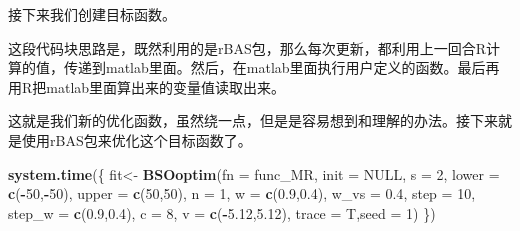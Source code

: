 \documentclass[]{ctexbook}
\newenvironment{Shaded}{\begin{snugshade}}{\end{snugshade}}
\newcommand{\KeywordTok}[1]{\textcolor[rgb]{0.13,0.29,0.53}{\textbf{#1}}}
\newcommand{\DataTypeTok}[1]{\textcolor[rgb]{0.13,0.29,0.53}{#1}}
\newcommand{\DecValTok}[1]{\textcolor[rgb]{0.00,0.00,0.81}{#1}}
\newcommand{\FloatTok}[1]{\textcolor[rgb]{0.00,0.00,0.81}{#1}}
\newcommand{\StringTok}[1]{\textcolor[rgb]{0.31,0.60,0.02}{#1}}
\newcommand{\CommentTok}[1]{\textcolor[rgb]{0.56,0.35,0.01}{\textit{#1}}}
\newcommand{\OtherTok}[1]{\textcolor[rgb]{0.56,0.35,0.01}{#1}}
\newcommand{\ControlFlowTok}[1]{\textcolor[rgb]{0.13,0.29,0.53}{\textbf{#1}}}
\newcommand{\OperatorTok}[1]{\textcolor[rgb]{0.81,0.36,0.00}{\textbf{#1}}}
\newcommand{\NormalTok}[1]{#1}
\theoremstyle{definition}
\theoremstyle{definition}
\theoremstyle{definition}
\theoremstyle{remark}
\begin{document}
接下来我们创建目标函数。

\begin{Shaded}
\end{Shaded}

这段代码块思路是，既然利用的是rBAS包，那么每次更新，都利用上一回合R计算的值，传递到matlab里面。然后，在matlab里面执行用户定义的函数。最后再用R把matlab里面算出来的变量值读取出来。

这就是我们新的优化函数，虽然绕一点，但是是容易想到和理解的办法。接下来就是使用rBAS包来优化这个目标函数了。

\begin{Shaded}
\begin{Highlighting}[]
\KeywordTok{system.time}\NormalTok{(\{}
\NormalTok{  fit<-}
\StringTok{    }\KeywordTok{BSOoptim}\NormalTok{(}\DataTypeTok{fn =}\NormalTok{ func_MR,}
             \DataTypeTok{init =} \OtherTok{NULL}\NormalTok{,}
             \DataTypeTok{s =} \DecValTok{2}\NormalTok{,}
             \DataTypeTok{lower =} \KeywordTok{c}\NormalTok{(}\OperatorTok{-}\DecValTok{50}\NormalTok{,}\OperatorTok{-}\DecValTok{50}\NormalTok{),}
             \DataTypeTok{upper =} \KeywordTok{c}\NormalTok{(}\DecValTok{50}\NormalTok{,}\DecValTok{50}\NormalTok{),}
             \DataTypeTok{n =} \DecValTok{1}\NormalTok{,}
             \DataTypeTok{w =} \KeywordTok{c}\NormalTok{(}\FloatTok{0.9}\NormalTok{,}\FloatTok{0.4}\NormalTok{),}
             \DataTypeTok{w_vs =} \FloatTok{0.4}\NormalTok{, }
             \DataTypeTok{step =} \DecValTok{10}\NormalTok{,}
             \DataTypeTok{step_w =} \KeywordTok{c}\NormalTok{(}\FloatTok{0.9}\NormalTok{,}\FloatTok{0.4}\NormalTok{),}
             \DataTypeTok{c =} \DecValTok{8}\NormalTok{,}
             \DataTypeTok{v =} \KeywordTok{c}\NormalTok{(}\OperatorTok{-}\FloatTok{5.12}\NormalTok{,}\FloatTok{5.12}\NormalTok{),}
             \DataTypeTok{trace =}\NormalTok{ T,}\DataTypeTok{seed =} \DecValTok{1}\NormalTok{)}
\NormalTok{\}) }
\end{Highlighting}
\end{Shaded}
\end{document}
